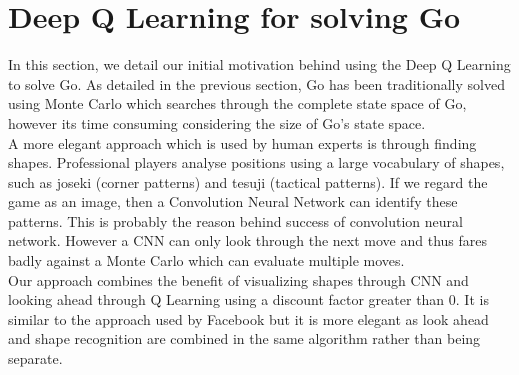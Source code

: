 
\section{Deep Q Learning for solving Go}
In this section, we detail our initial motivation behind using the Deep Q Learning to solve Go. As detailed in the previous section, Go has been traditionally solved using Monte Carlo which searches through the complete state space of Go, however its time consuming considering the size of Go's state space. 
\\
A more elegant approach which is used by human experts is through finding shapes. Professional players analyse positions using a large vocabulary of shapes, such as joseki (corner patterns) and tesuji (tactical patterns). If we regard the game as an image, then a Convolution Neural Network can identify these patterns. This is probably the reason behind success of convolution neural network. However a CNN can only look through the next move and thus fares badly against a Monte Carlo which can evaluate multiple moves.
\\
Our approach combines the benefit of visualizing shapes through CNN and looking ahead through Q Learning using a discount factor greater than 0. It is similar to the approach used by Facebook but it is more elegant as look ahead and shape recognition are combined in the same algorithm rather than being separate.